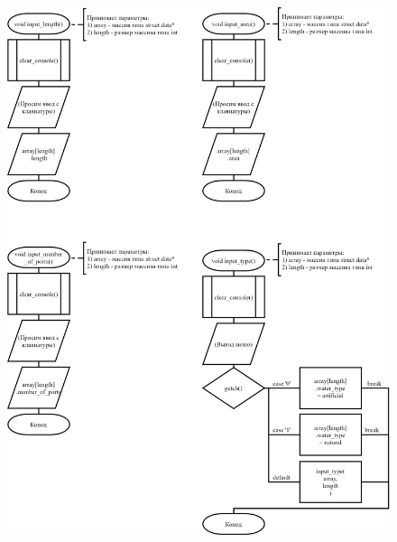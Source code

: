 \begin{figure}[!htp]
    \includegraphics[width=17cm]{../../Makefile-project/src/menu/add_element_end/add_element_end-2.png}
\end{figure}

